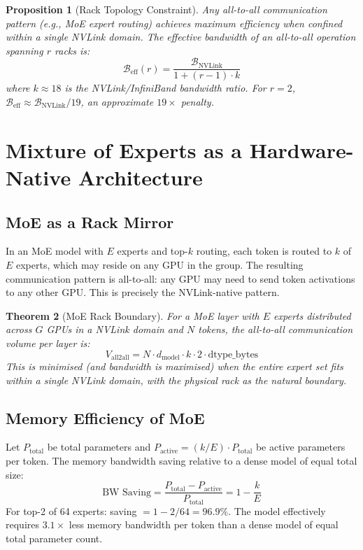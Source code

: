 \documentclass[11pt,a4paper]{article}
\newtheorem{theorem}{Theorem}
\newtheorem{proposition}[theorem]{Proposition}
\newcommand{\BW}{\mathcal{B}}
\newcommand{\eg}{\textit{e.g.}}
\begin{document}
\begin{proposition}[Rack Topology Constraint]
Any all-to-all communication pattern (\eg, MoE expert routing) achieves
maximum efficiency when confined within a single NVLink domain. The effective
bandwidth of an all-to-all operation spanning $r$ racks is:
\[
  \BW_\text{eff}(r) = \frac{\BW_\text{NVLink}}{1 + (r-1) \cdot k}
\]
where $k \approx 18$ is the NVLink/InfiniBand bandwidth ratio. For $r=2$,
$\BW_\text{eff} \approx \BW_\text{NVLink}/19$, an approximate $19\times$ penalty.
\end{proposition}

\section{Mixture of Experts as a Hardware-Native Architecture}
\label{sec:moe}

\subsection{MoE as a Rack Mirror}

In an MoE model with $E$ experts and top-$k$ routing, each token is routed
to $k$ of $E$ experts, which may reside on any GPU in the group. The
resulting communication pattern is all-to-all: any GPU may need to send
token activations to any other GPU. This is precisely the NVLink-native
pattern.

\begin{theorem}[MoE Rack Boundary]
\label{thm:moe-rack}
For a MoE layer with $E$ experts distributed across $G$ GPUs in a NVLink
domain and $N$ tokens, the all-to-all communication volume per layer is:
\[
  V_\text{all2all} = N \cdot d_\text{model} \cdot k \cdot 2 \cdot \text{dtype\_bytes}
\]
This is minimised (and bandwidth is maximised) when the entire expert set
fits within a single NVLink domain, with the physical rack as the natural
boundary.
\end{theorem}

\subsection{Memory Efficiency of MoE}

Let $P_\text{total}$ be total parameters and $P_\text{active} = (k/E) \cdot P_\text{total}$
be active parameters per token. The memory bandwidth saving relative to a
dense model of equal total size:
\[
  \text{BW Saving} = \frac{P_\text{total} - P_\text{active}}{P_\text{total}}
                   = 1 - \frac{k}{E}
\]
For top-2 of 64 experts: saving $= 1 - 2/64 = 96.9\%$. The model effectively
requires $3.1\times$ less memory bandwidth per token than a dense model of
equal total parameter count.
\end{document}
